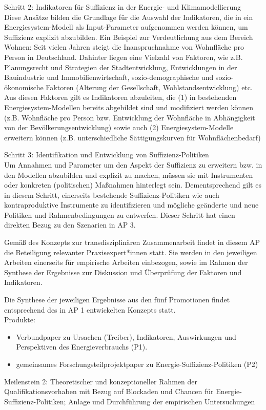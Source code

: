 \documentclass[a4paper,11pt,twoside]{scrartcl}
\begin{document}
Schritt 2: Indikatoren für Suffizienz in der Energie- und Klimamodellierung\\
Diese Ansätze bilden die Grundlage für die Auswahl der Indikatoren, die in ein Energiesystem-Modell als Input-Parameter aufgenommen werden können, um Suffizienz explizit abzubilden.  
Ein Beispiel zur Verdeutlichung aus dem Bereich Wohnen: Seit vielen Jahren steigt die Inanspruchnahme von Wohnfläche pro Person in Deutschland. Dahinter liegen eine Vielzahl von Faktoren, wie z.B. Planungsrecht und Strategien der Stadtentwicklung, Entwicklungen in der Bauindustrie und Immobilienwirtschaft, sozio-demographische und sozio-ökonomische Faktoren (Alterung der Gesellschaft, Wohlstandsentwicklung) etc. 
Aus diesen Faktoren gilt es Indikatoren abzuleiten, die (1) in bestehenden Energiesystem-Modellen bereits abgebildet sind und modifiziert werden können (z.B. Wohnfläche pro Person bzw. Entwicklung der Wohnfläche in Abhängigkeit von der Bevölkerungsentwicklung) sowie auch (2) Energiesystem-Modelle erweitern können (z.B. unterschiedliche Sättigungskurven für Wohnflächenbedarf)

Schritt 3: Identifikation und Entwicklung von Suffizienz-Politiken \\
Um Annahmen und Parameter um den Aspekt der Suffizienz zu erweitern bzw. in den Modellen abzubilden und explizit zu machen, müssen sie mit Instrumenten oder konkreten (politischen) Maßnahmen hinterlegt sein. Dementsprechend gilt es in diesem Schritt, einerseits bestehende Suffizienz-Politiken wie auch kontraproduktive Instrumente zu identifizieren und mögliche geänderte und neue Politiken und Rahmenbedingungen zu entwerfen. Dieser Schritt hat einen direkten Bezug zu den Szenarien in AP 3.

Gemäß des Konzepts zur transdisziplinären Zusammenarbeit findet in diesem AP die Beteiligung relevanter Praxisexpert*innen statt. Sie werden in den jeweiligen Arbeiten einerseits für empirische Arbeiten einbezogen, sowie im Rahmen der Synthese der Ergebnisse zur Diskussion und Überprüfung der Faktoren und Indikatoren.

Die Synthese der jeweiligen Ergebnisse aus den fünf Promotionen findet entsprechend des in AP 1 entwickelten Konzepts statt.\\  
Produkte:
\begin{itemize}
    \item Verbundpaper zu Ursachen (Treiber), Indikatoren, Auswirkungen und Perspektiven des Energieverbrauchs (P1).
    \item gemeinsames Forschungsteilprojektpaper zu Energie-Suffizienz-Politiken (P2)
\end{itemize}
Meilenstein 2: Theoretischer und konzeptioneller Rahmen der Qualifikationsvorhaben mit Bezug auf Blockaden und Chancen für Energie-Suffizienz-Politiken; Anlage und Durchführung der empirischen Untersuchungen
\end{document}
